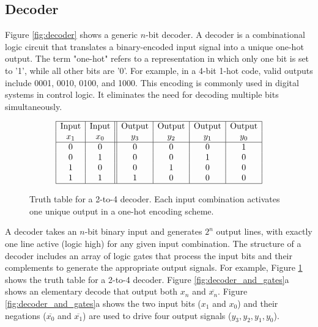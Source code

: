
\subsection{Decoder}
Figure \ref{fig:decoder} shows a generic $n$-bit decoder. A decoder is a combinational logic circuit that translates a binary-encoded input signal into a unique one-hot output. The term "one-hot" refers to a representation in which only one bit is set to '1', while all other bits are '0'. For example, in a 4-bit 1-hot code, valid outputs include 0001, 0010, 0100, and 1000. This encoding is commonly used in digital systems in control logic. It eliminates the need for decoding multiple bits simultaneously. 

\begin{figure}[h!]
\centering
\[
\begin{array}{|c|c||c|c|c|c|}
\hline
\text{Input} & \text{Input} & \text{Output} & \text{Output} & \text{Output} & \text{Output} \\
x_1 & x_0 &  y_3 &  y_2 & y_1 & y_0 \\
\hline
0 & 0 & 0 & 0 & 0 & 1 \\
0 & 1 & 0 & 0 & 1 & 0 \\
1 & 0 & 0 & 1 & 0 & 0 \\
1 & 1 & 1 & 0 & 0 & 0 \\
\hline
\end{array}
\]
\caption{Truth table for a 2-to-4 decoder. Each input combination activates one unique output in a one-hot encoding scheme.}
\label{fig:decoder_truth_table}
\end{figure}

A decoder takes an \(n\)-bit binary input and generates \(2^n\) output lines, with exactly one line active (logic high) for any given input combination. The structure of a decoder includes an array of logic gates that process the input bits and their complements to generate the appropriate output signals. For example, Figure \ref{fig:decoder_truth_table} shows the truth table for a 2-to-4 decoder. Figure \ref{fig:decoder_and_gates}a shows an elementary decode that output both $x_n$ and $\overline{x_n}$. Figure \ref{fig:decoder_and_gates}a shows the two input bits (\(x_1\) and \(x_0\)) and their negations (\(\overline{x_0}\) and \(\overline{x_1}\)) are used to drive four output signals (\(y_3, y_2, y_1, y_0\)). 


